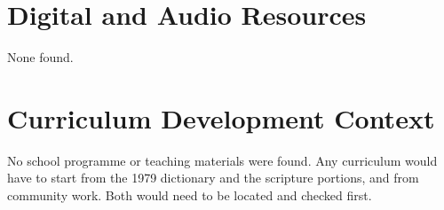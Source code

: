 \documentclass[12pt]{article}
\begin{document}
\section{Digital and Audio Resources}
None found.

\section{Curriculum Development Context}
No school programme or teaching materials were found. Any curriculum would have to start from the 1979 dictionary and the scripture portions, and from community work. Both would need to be located and checked first.
\end{document}
